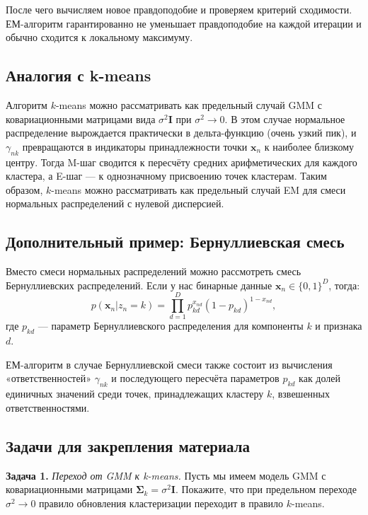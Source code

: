 После чего вычисляем новое правдоподобие и проверяем критерий сходимости. ЕМ-алгоритм гарантированно не уменьшает правдоподобие на каждой итерации и обычно сходится к локальному максимуму.

\subsection{Аналогия с k-means}

Алгоритм $k$-means можно рассматривать как предельный случай GMM с ковариационными матрицами вида $\sigma^2 \mathbf{I}$ при $\sigma^2 \to 0$. В этом случае нормальное распределение вырождается практически в дельта-функцию (очень узкий пик), и $\gamma_{nk}$ превращаются в индикаторы принадлежности точки $\mathbf{x}_n$ к наиболее близкому центру. Тогда M-шаг сводится к пересчёту средних арифметических для каждого кластера, а E-шаг --- к однозначному присвоению точек кластерам. Таким образом, $k$-means можно рассматривать как предельный случай EM для смеси нормальных распределений с нулевой дисперсией.

\subsection{Дополнительный пример: Бернуллиевская смесь}

Вместо смеси нормальных распределений можно рассмотреть смесь Бернуллиевских распределений. Если у нас бинарные данные $\mathbf{x}_n \in \{0,1\}^D$, тогда:
\begin{equation*}
p(\mathbf{x}_n | z_n = k) = \prod_{d=1}^D p_{kd}^{x_{nd}} (1 - p_{kd})^{1 - x_{nd}},
\end{equation*}
где $p_{kd}$ --- параметр Бернуллиевского распределения для компоненты $k$ и признака $d$.

ЕМ-алгоритм в случае Бернуллиевской смеси также состоит из вычисления «ответственностей» $\gamma_{nk}$ и последующего пересчёта параметров $p_{kd}$ как долей единичных значений среди точек, принадлежащих кластеру $k$, взвешенных ответственностями.

\subsection{Задачи для закрепления материала}

\noindent\textbf{Задача 1.} \emph{Переход от GMM к k-means.}  
Пусть мы имеем модель GMM с ковариационными матрицами $\boldsymbol{\Sigma}_k = \sigma^2 \mathbf{I}$. Покажите, что при предельном переходе $\sigma^2 \to 0$ правило обновления кластеризации переходит в правило $k$-means. 

